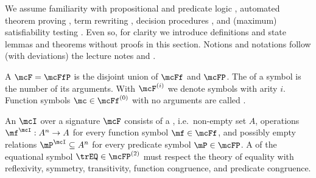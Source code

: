 %
We assume familiarity with propositional and predicate logic \cite{Huth:2004:LCS:975331},
automated theorem proving \cite{Fitting:1996:FLA:230183},
term rewriting \cite{Baader:1998:TR:280474},
decision procedures \cite{Kroening:2008:DPA:1391237},
and (maximum) satisfiability testing \cite{Biere:2009:HSV:1550723}.
Even so, for clarity we introduce
definitions and state lemmas and theorems without proofs in this section.
Notions and notations follow (with deviations) the lecture notes \cite{AM2015tr} and \cite{GM2013ar}.
\begin{definition}\label{def:signature}
A  \( \mcF=\mcFfP \) is the disjoint union of  \( \mcFf \)
and  \( \mcFP \).
The  of a symbol is the number of its arguments.
With \( \mcF^{(i)} \) we denote symbols with arity \( i \).
Function symbols \( \mc\in\mcFf^{(0)} \) with no arguments are called .
\end{definition}
\begin{definition}
An  \( \mcI \) over a signature \( \mcF \) consists
of a , i.e.~non-empty set  \( A \),
operations \( \mf^\mcI: A^n\rightarrow A \)  for every function symbol \( \mf\in\mcFf \),
and possibly empty relations \( \mP^\mcI\subseteq A^n \) for every predicate symbol \( \mP\in\mcFP \).
A  of the equational symbol \( {\trEQ}\in\mcFP^{(2)} \) must respect the theory of equality
with reflexivity, symmetry, transitivity, function congruence, and predicate congruence.
\end{definition}
